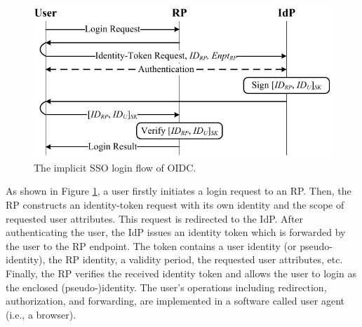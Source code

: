 \begin{figure}[t]
  \centering
  \includegraphics[width=0.9\linewidth]{fig/OIDC1.pdf}
  \caption{The implicit SSO login flow of OIDC.}
  \label{fig:OpenID}
\end{figure}

As shown in Figure \ref{fig:OpenID}, a user firstly initiates a login request to an RP.
Then, the RP constructs an identity-token request with its own identity
 and the scope of requested user attributes.
This request is redirected to the IdP.
After authenticating the user,
    the IdP issues an identity token
        which is forwarded by the user to the RP endpoint.
The token contains a user identity (or pseudo-identity),
    the RP identity, a validity period, the requested user attributes, etc.
Finally, the RP verifies the received identity token and
 allows the user to login as the  enclosed (pseudo-)identity.
The user's operations including redirection, authorization, and forwarding,
    are implemented in a software called user agent (i.e., a browser).




